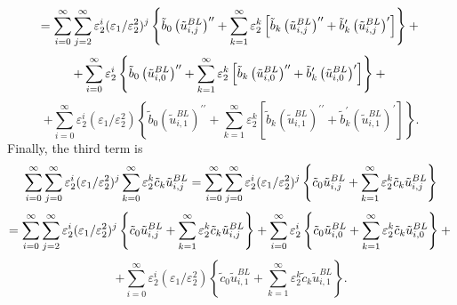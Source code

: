 \documentclass[12pt]{article}
\begin{document}
%
\begin{equation*}
=\sum_{i=0}^{\infty }\sum_{j=2}^{\infty }\varepsilon _{2}^{i}(\varepsilon
_{1}/\varepsilon _{2}^{2})^{j}\left\{ \tilde{b}_{0}\left(\tilde{u}^{BL}_{i,j}\right)^{\prime
\prime }+\sum_{k=1}^{\infty }\varepsilon _{2}^{k}\left[ \tilde{b}_{k}\left(\tilde{%
u}^{BL}_{i,j}\right)^{\prime \prime }+\tilde{b}_{k}^{\prime }\left(\tilde{u}^{BL}_{i,j}\right)^{\prime }%
\right] \right\} + \\
\end{equation*}
%
\begin{equation*}
+\sum_{i=0}^{\infty }\varepsilon _{2}^{i}\left\{ \tilde{b}_{0}\left(\tilde{u}^{BL}%
_{i,0}\right)^{\prime \prime }+\sum_{k=1}^{\infty }\varepsilon _{2}^{k}\left[ 
\tilde{b}_{k}\left(\tilde{u}^{BL}_{i,0}\right)^{\prime \prime }+\tilde{b}_{k}^{\prime }%
\left(\tilde{u}^{BL}_{i,0}\right)^{\prime }\right] \right\} + \\
\end{equation*}
%
\begin{equation*}
+\sum_{i=0}^{\infty }\varepsilon _{2}^{i}(\varepsilon _{1}/\varepsilon
_{2}^{2})\left\{ \tilde{b}_{0}\left(\tilde{u}^{BL}_{i,1}\right)^{\prime \prime
}+\sum_{k=1}^{\infty }\varepsilon _{2}^{k}\left[ \tilde{b}_{k}\left(\tilde{u}^{BL}%
_{i,1}\right)^{\prime \prime}+\tilde{b}_{k}^{\prime }\left(\tilde{u}^{BL}_{i,1}\right)^{\prime }%
\right] \right\} .
\end{equation*}
%
Finally, the third term is
%
\begin{equation*}
\sum_{i=0}^{\infty }\sum_{j=0}^{\infty }\varepsilon _{2}^{i}(\varepsilon
_{1}/\varepsilon _{2}^{2})^{j}\sum_{k=0}^{\infty }\varepsilon _{2}^{k}\tilde{%
c}_{k}\tilde{u}^{BL}_{i,j}=\sum_{i=0}^{\infty }\sum_{j=0}^{\infty }\varepsilon
_{2}^{i}(\varepsilon _{1}/\varepsilon _{2}^{2})^{j}\left\{ \tilde{c}_{0}%
\tilde{u}^{BL}_{i,j}+\sum_{k=1}^{\infty }\varepsilon _{2}^{k}\tilde{c}_{k}\tilde{u%
}^{BL}_{i,j}\right\}
\end{equation*}
%
\begin{equation*}
=\sum_{i=0}^{\infty }\sum_{j=2}^{\infty }\varepsilon _{2}^{i}(\varepsilon
_{1}/\varepsilon _{2}^{2})^{j}\left\{ \tilde{c}_{0}\tilde{u}^{BL}%
_{i,j}+\sum_{k=1}^{\infty }\varepsilon _{2}^{k}\tilde{c}_{k}\tilde{u}^{BL}%
_{i,j}\right\} +\sum_{i=0}^{\infty }\varepsilon _{2}^{i}\left\{ \tilde{c}_{0}%
\tilde{u}^{BL}_{i,0}+\sum_{k=1}^{\infty }\varepsilon _{2}^{k}\tilde{c}_{k}\tilde{u%
}^{BL}_{i,0}\right\} +\\
\end{equation*}
%
\begin{equation*}
+\sum_{i=0}^{\infty }\varepsilon _{2}^{i}(\varepsilon _{1}/\varepsilon
_{2}^{2})\left\{ \tilde{c}_{0}\tilde{u}^{BL}_{i,1}+\sum_{k=1}^{\infty
}\varepsilon _{2}^{k}\tilde{c}_{k}\tilde{u}^{BL}_{i,1}\right\} .
\end{equation*}
\end{document}
